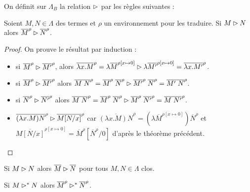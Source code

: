 \begin{defi}
    On définit sur $\Lambda_B$ la relation $\reduc$ par les règles suivantes :

    \begin{center}
        \begin{prooftree}
        \end{prooftree}
        \qquad
        \begin{prooftree}
        \end{prooftree}
        \qquad
        \begin{prooftree}
        \end{prooftree}

        \vspace{0.5cm}

        \begin{prooftree}
        \end{prooftree}
    \end{center}
\end{defi}

\begin{prop}
    Soient $M,N\in\Lambda$ des termes et $\rho$ un environnement pour les traduire. Si $M\reduc N$ alors $\overline M^\rho\reduc\overline N^\rho$.
\end{prop}

\begin{proof}
    On prouve le résultat par induction :
    \begin{itemize}[label=$\bullet$]
        \item si $\overline M^\rho\reduc \overline{M'}^\rho$, alors $\overline{\lambda x.M}^\rho = \lambda \overline M^{\rho[x\mapsto 0]} \reduc \lambda \overline{M'}^{\rho[x\mapsto 0]} = \overline{\lambda x.M'}^\rho$.
        \item si $\overline M^\rho\reduc \overline{M'}^\rho$ alors $\overline{M\;N}^\rho = \overline M^\rho\;\overline N^\rho\reduc \overline{M'}^\rho\;\overline N^\rho = \overline{M'\;N}^\rho$.
        \item si $\overline N^\rho\reduc \overline{N'}^\rho$ alors $\overline{M\;N}^\rho = \overline M^\rho\;\overline N^\rho\reduc \overline{M}^\rho\;\overline{N'}^\rho = \overline{M\;N'}^\rho$.
        \item $\overline{(\lambda x.M)N}^\rho\reduc \overline{M[N/x]}^\rho$ car $\overline{(\lambda x.M)N}^\rho = (\lambda \overline M^{\rho[x\mapsto 0]})\overline N^\rho$ et $\overline{M[N/x]}^{\rho[x\mapsto 0]} = \overline M^\rho[\overline N^\rho/0]$ d'après le théorème précédent.
    \end{itemize}
\end{proof}

\begin{cor}
    Si $M\reduc N$ alors $\overline M\reduc \overline N$ pour tous $M,N\in\Lambda$ clos.
\end{cor}

\begin{cor}
    Si $M\reduc^* N$ alors $\overline M^\rho\reduc^* \overline N^\rho$.
\end{cor}
